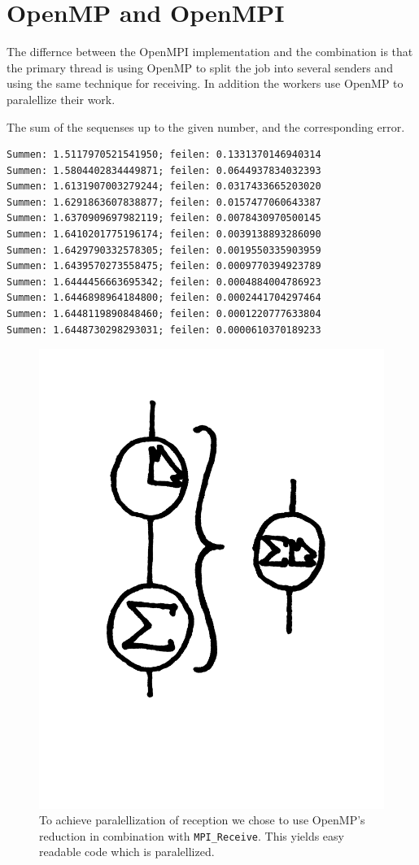\section{OpenMP and OpenMPI }
The differnce between the OpenMPI implementation and the combination is that the primary thread is using OpenMP to split the job into several senders and using the same technique for receiving. 
In addition the workers use OpenMP to paralellize their work. 

The sum of the sequenses up to the given number, and the corresponding error.
\begin{verbatim}
Summen: 1.5117970521541950; feilen: 0.1331370146940314
Summen: 1.5804402834449871; feilen: 0.0644937834032393
Summen: 1.6131907003279244; feilen: 0.0317433665203020
Summen: 1.6291863607838877; feilen: 0.0157477060643387
Summen: 1.6370909697982119; feilen: 0.0078430970500145
Summen: 1.6410201775196174; feilen: 0.0039138893286090
Summen: 1.6429790332578305; feilen: 0.0019550335903959
Summen: 1.6439570273558475; feilen: 0.0009770394923789
Summen: 1.6444456663695342; feilen: 0.0004884004786923
Summen: 1.6446898964184800; feilen: 0.0002441704297464
Summen: 1.6448119890848460; feilen: 0.0001220777633804
Summen: 1.6448730298293031; feilen: 0.0000610370189233
\end{verbatim}
\begin{figure}
\caption{To achieve paralellization of reception we chose to use OpenMP's reduction in combination with {\tt MPI\_Receive}. This yields easy readable code which is paralellized. }
\includegraphics[width=\textwidth]{flyt2}
\end{figure}
